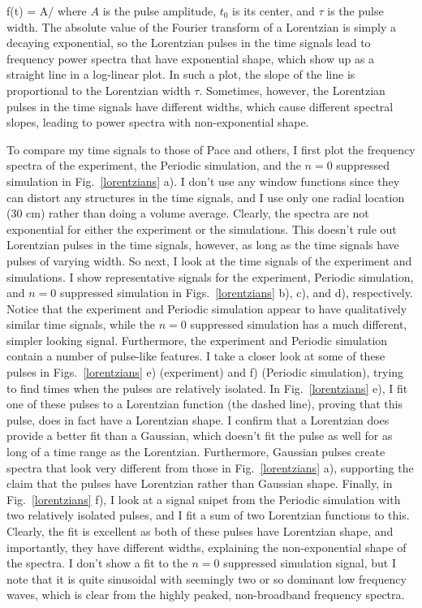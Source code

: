 \beq
\label{lorentz_eqn}
f(t) = A/
\eeq
where $A$ is the pulse amplitude, $t_0$ is its center, and $\tau$ is the pulse width. The absolute value of the Fourier transform of a Lorentzian is simply a decaying exponential, so
the Lorentzian pulses in the time signals lead to frequency power spectra that have exponential shape, which show up as a straight line in a log-linear plot. In such a plot, the slope of the line
is proportional to the Lorentzian width $\tau$. Sometimes, however, the Lorentzian
pulses in the time signals have different widths, which cause different spectral slopes, leading to power spectra with non-exponential shape. 

To compare my time signals to those of Pace and others, I first plot the frequency spectra of the experiment,
the Periodic simulation, and the $n=0$ suppressed simulation in Fig.~\ref{lorentzians} a). I don't use any window functions since they can distort any structures in the time signals,
and I use only one radial location (30 cm) rather than doing a volume average. Clearly, the spectra are not exponential for either the experiment or the simulations. This doesn't rule out
Lorentzian pulses in the time signals, however, as long as the time signals have pulses of varying width. So next, I look at the time signals of the experiment and simulations. I show representative
signals for the experiment, Periodic simulation, and $n=0$ suppressed simulation in Figs.~\ref{lorentzians} b), c), and d), respectively. Notice that the experiment and Periodic simulation
appear to have qualitatively similar time signals, while the $n=0$ suppressed simulation has a much different, simpler looking signal. Furthermore, the experiment and Periodic simulation contain
a number of pulse-like features. I take a closer look at some of these pulses in Figs.~\ref{lorentzians} e) (experiment) and f) (Periodic simulation), trying to find times when the pulses
are relatively isolated. In Fig.~\ref{lorentzians} e), I fit one of these pulses to a Lorentzian function (the dashed line), 
proving that this pulse, does in fact have a Lorentzian shape. I confirm that a Lorentzian does provide a better fit than a Gaussian, which doesn't fit the pulse as well for as long of a time
range as the Lorentzian. Furthermore, Gaussian pulses create spectra that look very different from those in Fig.~\ref{lorentzians} a), supporting the claim that the pulses have Lorentzian
rather than Gaussian shape. Finally, in Fig.~\ref{lorentzians} f),
I look at a signal snipet from the Periodic simulation with two relatively isolated pulses, and I fit a sum of two Lorentzian functions to this. Clearly, the fit is excellent as
both of these pulses have Lorentzian shape, and importantly, they have different widths, explaining the non-exponential shape of the spectra. I don't show a fit to the $n=0$ suppressed simulation
signal, but I note that it is quite sinusoidal with seemingly two or so dominant low frequency waves, which is clear from the highly peaked, non-broadband frequency spectra.


